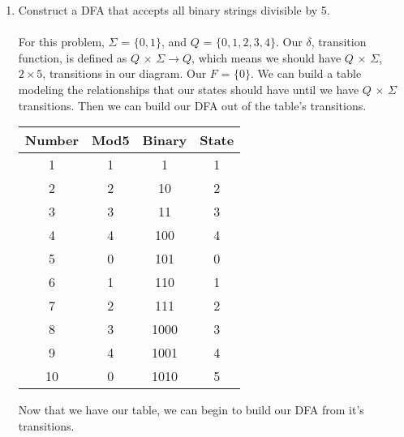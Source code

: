 \documentclass[12pt]{article}
\begin{document}
\begin{enumerate}
	\item Construct a DFA that accepts all binary strings divisible by 5.\\ \\
	For this problem, $\Sigma$ = $\{0, 1\}$, and $Q$ = $\{0 ,1, 2, 3, 4\}$. Our $\delta$, transition function, is defined as $Q$ $\times$ $\Sigma \rightarrow Q$, which means we should have $Q$ $\times$ $\Sigma$, $2 \times 5$, transitions in our diagram. Our $F$ = $\{0\}$. We can build a table modeling the relationships that our states should have until we have $Q$ $\times$ $\Sigma$ transitions. Then we can build our DFA out of the table's transitions.
	\begin{center}
	\begin{tabular}{c c c c}
	Number & Mod5 & Binary & State \\ \hline
	1 & 1 & 1 & 1 \\
	2 & 2 & 10 & 2 \\
	3 & 3 & 11 & 3 \\
	4 & 4 & 100 & 4 \\
	5 & 0 & 101 & 0 \\
	6 & 1 & 110 & 1 \\
	7 & 2 & 111 & 2 \\
	8 & 3 & 1000 & 3 \\
	9 & 4 & 1001 & 4 \\
	10 & 0 & 1010 & 5 \\
	\end{tabular}
	\end{center}
	
	Now that we have our table, we can begin to build our DFA from it's transitions. 
	\\ \\ \\  \\ 
	\pagebreak
	

\end{enumerate}
\end{document}
